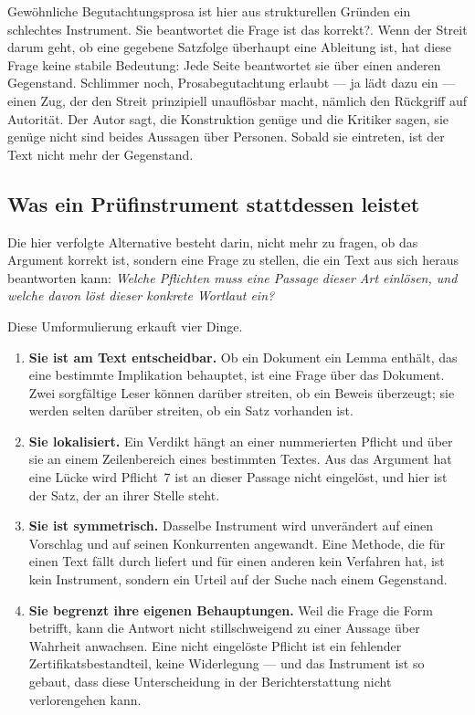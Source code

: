 \documentclass[11pt,a4paper]{article}
\theoremstyle{definition}
\begin{document}
Gewöhnliche Begutachtungsprosa ist hier aus strukturellen Gründen ein schlechtes
Instrument. Sie beantwortet die Frage \glqq ist das korrekt?\grqq. Wenn der Streit darum
geht, ob eine gegebene Satzfolge überhaupt eine Ableitung ist, hat diese Frage
keine stabile Bedeutung: Jede Seite beantwortet sie über einen anderen
Gegenstand. Schlimmer noch, Prosabegutachtung erlaubt --- ja lädt dazu ein --- einen
Zug, der den Streit prinzipiell unauflösbar macht, nämlich den Rückgriff auf
Autorität. \glqq Der Autor sagt, die Konstruktion genüge\grqq{} und \glqq die Kritiker sagen, sie
genüge nicht\grqq{} sind beides Aussagen über Personen. Sobald sie eintreten, ist der
Text nicht mehr der Gegenstand.

\subsection{Was ein Prüfinstrument stattdessen leistet}

Die hier verfolgte Alternative besteht darin, nicht mehr zu fragen, ob das
Argument korrekt ist, sondern eine Frage zu stellen, die ein Text aus sich heraus
beantworten kann: \emph{Welche Pflichten muss eine Passage dieser Art einlösen,
und welche davon löst dieser konkrete Wortlaut ein?}

Diese Umformulierung erkauft vier Dinge.

\begin{enumerate}
\item \textbf{Sie ist am Text entscheidbar.} Ob ein Dokument ein Lemma enthält,
  das eine bestimmte Implikation behauptet, ist eine Frage über das Dokument.
  Zwei sorgfältige Leser können darüber streiten, ob ein Beweis überzeugt; sie
  werden selten darüber streiten, ob ein Satz vorhanden ist.
\item \textbf{Sie lokalisiert.} Ein Verdikt hängt an einer nummerierten Pflicht
  und über sie an einem Zeilenbereich eines bestimmten Textes. Aus \glqq das Argument
  hat eine Lücke\grqq{} wird \glqq Pflicht~7 ist an dieser Passage nicht eingelöst, und hier
  ist der Satz, der an ihrer Stelle steht\grqq.
\item \textbf{Sie ist symmetrisch.} Dasselbe Instrument wird unverändert auf
  einen Vorschlag und auf seinen Konkurrenten angewandt. Eine Methode, die für
  einen Text \glqq fällt durch\grqq{} liefert und für einen anderen kein Verfahren hat, ist
  kein Instrument, sondern ein Urteil auf der Suche nach einem Gegenstand.
\item \textbf{Sie begrenzt ihre eigenen Behauptungen.} Weil die Frage die Form
  betrifft, kann die Antwort nicht stillschweigend zu einer Aussage über Wahrheit
  anwachsen. Eine nicht eingelöste Pflicht ist ein fehlender
  Zertifikatsbestandteil, keine Widerlegung --- und das Instrument ist so gebaut,
  dass diese Unterscheidung in der Berichterstattung nicht verlorengehen kann.
\end{enumerate}
\end{document}
